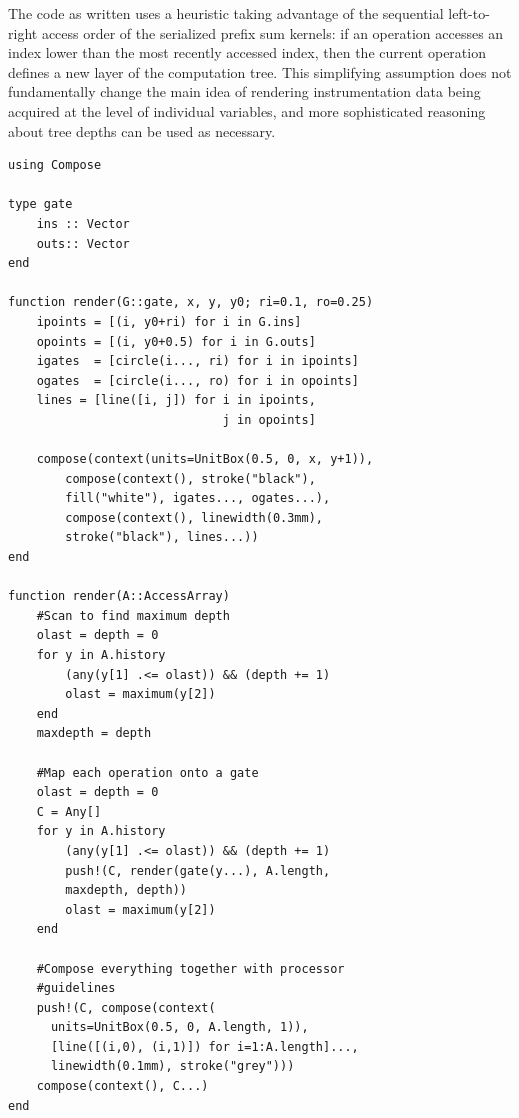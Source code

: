 \documentclass{sig-alternate}
\begin{document}
The code as written uses a heuristic taking advantage of the sequential
left-to-right access order of the serialized prefix sum kernels: if an
operation accesses an index lower than the most recently accessed index, then
the current operation defines a new layer of the computation tree. This
simplifying assumption does not fundamentally change the main idea of rendering
instrumentation data being acquired at the level of individual variables, and
more sophisticated reasoning about tree depths can be used as necessary.

\begin{verbatim}
using Compose

type gate
    ins :: Vector
    outs:: Vector
end

function render(G::gate, x, y, y0; ri=0.1, ro=0.25)
    ipoints = [(i, y0+ri) for i in G.ins]
    opoints = [(i, y0+0.5) for i in G.outs]
    igates  = [circle(i..., ri) for i in ipoints]
    ogates  = [circle(i..., ro) for i in opoints]
    lines = [line([i, j]) for i in ipoints,
                              j in opoints]

    compose(context(units=UnitBox(0.5, 0, x, y+1)),
        compose(context(), stroke("black"),
	    fill("white"), igates..., ogates...),
        compose(context(), linewidth(0.3mm),
	    stroke("black"), lines...))
end

function render(A::AccessArray)
    #Scan to find maximum depth
    olast = depth = 0
    for y in A.history
        (any(y[1] .<= olast)) && (depth += 1)
        olast = maximum(y[2])
    end
    maxdepth = depth
    
    #Map each operation onto a gate
    olast = depth = 0
    C = Any[]
    for y in A.history
        (any(y[1] .<= olast)) && (depth += 1)
        push!(C, render(gate(y...), A.length,
	    maxdepth, depth))
        olast = maximum(y[2])
    end
    
    #Compose everything together with processor
    #guidelines
    push!(C, compose(context(
      units=UnitBox(0.5, 0, A.length, 1)),
      [line([(i,0), (i,1)]) for i=1:A.length]...,
      linewidth(0.1mm), stroke("grey")))
    compose(context(), C...)
end
\end{verbatim}
\end{document}
